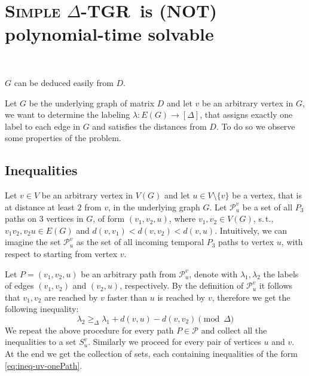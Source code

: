 \documentclass[11pt,a4paper]{article}
\theoremstyle{remark}
\theoremstyle{definition}
\newcommand{\st}{s.\,t.,\ }
\newcommand{\deltaExact}{\textsc{Simple $\Delta$-TGR}}
\begin{document}
	


\clearpage

\appendix

\section{
\texorpdfstring{\deltaExact\ is (NOT) polynomial-time solvable}
{\textsc{Simple Delta-TGR} is polynomial-time solvable}
}\

$G$ can be deduced easily from $D$.

	Let $G$ be the underlying graph of matrix $D$ and let $v$ be an arbitrary vertex in $G$, we want to determine the labeling $\lambda: E(G) \rightarrow [\Delta]$, that assigns exactly one label to each edge in $G$ and satisfies the distances from $D$.
	To do so we observe some properties of the problem.
	
\subsection*{Inequalities}
	
	Let $v \in V$ be an arbitrary vertex in $V(G)$ and let $u \in V \setminus \{v\}$ be a vertex, that is at distance at least $2$ from $v$, in the underlying graph $G$.
	Let $\mathcal{P}_{u}^v$ be a set of all $P_3$ paths on $3$ vertices in $G$, of form $(v_1, v_2, u)$, where $v_1, v_2 \in V(G)$, \st $v_1 v_2, v_2 u \in E(G)$ and $d(v,v_1) < d(v,v_2) < d(v,u)$. 
	Intuitively, we can imagine the set $\mathcal{P}_{u}^v$ as the set of all incoming temporal $P_3$ paths to vertex $u$, with respect to starting from vertex $v$.
	
	Let $P = (v_1,v_2,u)$ be an arbitrary path from $\mathcal{P}_u^v$, denote with $\lambda_1, \lambda_2$ the labels of edges $(v_1,v_2)$ and $(v_2, u)$, respectively.
	By the definition of $\mathcal{P}_u^v$ it follows that $v_1, v_2$ are reached by $v$ faster than $u$ is reached by $v$, therefore we get the following inequality:
	\begin{equation}\label{eq:ineq-uv-onePath}
	    \lambda_2 \geq_\Delta \lambda_1 + d(v,u)-d(v,v_2) \pmod \Delta
	\end{equation}
	We repeat the above procedure for every path $P \in \mathcal{P}$ and collect all the inequalities to a set $S_u^v$.
	Similarly we proceed for every pair of vertices $u$ and $v$.
	At the end we get the collection of sets, each containing inequalities of the form \cref{eq:ineq-uv-onePath}.
	
\end{document}
